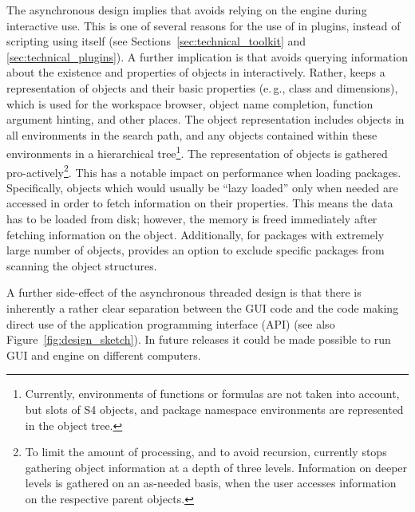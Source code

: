The asynchronous design implies that  avoids relying on the
 engine during interactive use. This is one of several reasons for
the use of  in plugins, instead of scripting using
 itself (see Sections~\ref{sec:technical_toolkit} and \ref{sec:technical_plugins}).
A further implication is that  avoids querying information about the
existence and properties of objects in  interactively. Rather,
 keeps a representation of  objects and their basic properties
(e.\,g., class and dimensions), which is used for the workspace browser,
object name completion, function argument hinting, and
other places. The object representation includes objects in all environments
in the search path, and any objects contained within these environments in a
hierarchical tree\footnote{
    Currently, environments of functions or formulas are not taken into account, but slots of S4 objects,
    and package namespace environments are represented in the object tree.
}. The representation of  objects is gathered
pro-actively\footnote{
    To limit the amount of processing, and to avoid recursion,  currently stops
    gathering object information at a depth of three levels. Information on deeper levels is gathered
    on an as-needed basis, when the user accesses information on the respective parent objects.
}. This has a notable impact on performance when loading packages.
Specifically, objects which would usually be ``lazy loaded'' only when needed \citep[see][]{Ripley2004} are
accessed in order to fetch information on their properties. This means the data
has to be loaded from disk; however, the memory is freed immediately after fetching
information on the object. Additionally, for packages with extremely large number of objects, 
provides an option to exclude specific packages from scanning the object structures.

A further side-effect of the asynchronous threaded design is that there is
inherently a rather clear separation between the GUI code and the code making direct use
of the  application programming interface (API) (see also Figure~\ref{fig:design_sketch}). 
In future releases it could be made possible to run GUI and  engine on different computers.

